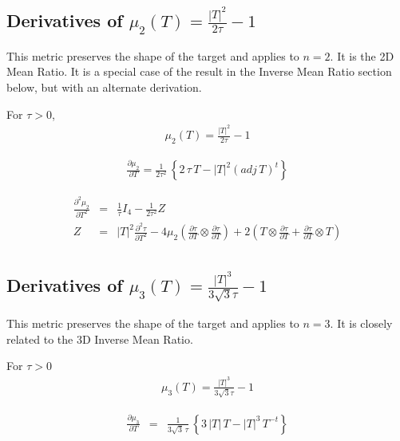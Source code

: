 \documentclass{report}
\begin{document}
\subsection{Derivatives of $\mu_2(T) = \frac{|T|^2}{2 \tau}-1$ \label{shape+2d} }

\noindent This metric preserves the shape of the target and applies
to $n=2$. It is the 2D Mean Ratio. It is a special case of the result
in the Inverse Mean Ratio section below, but with an alternate derivation. \newline

\noindent For $\tau>0$,
\begin{eqnarray}
\mu_2(T) = \frac{|T|^2}{2 \tau} - 1
\end{eqnarray}

\begin{eqnarray}
\frac{\partial \mu_2}{\partial T} = \frac{1}{2 \tau^2} \, \left\{ 2 \, \tau \, T - |T|^2 (adj \, T)^t \right\}
\end{eqnarray}

\begin{eqnarray}
\frac{\partial^2 \mu_2}{\partial T^2} & = & \frac{1}{\tau} I_4 - \frac{1}{2 \tau^2} Z \\
Z & = & |T|^2 \frac{\partial^2 \tau}{\partial T^2} - 4 \mu_2 \left(\frac{\partial \tau}{\partial T} \otimes \frac{\partial \tau}{\partial T} \right) + 2 \left( T \otimes \frac{\partial \tau}{\partial T} + \frac{\partial \tau}{\partial T} \otimes T \right) \nonumber \\
\end{eqnarray}

\subsection{Derivatives of $\mu_3(T)=\frac{|T|^3}{3 \sqrt{3} \tau}-1$ \label{shape+3d}}

\noindent This metric preserves the shape of the target and applies
to $n=3$. It is closely related to the 3D Inverse Mean Ratio. \newline

\noindent For $\tau>0$
\begin{eqnarray}
\mu_3(T)=\frac{|T|^3}{3 \sqrt{3} \tau} - 1
\end{eqnarray}

\begin{eqnarray}
\frac{\partial \mu_3}{\partial T} & = & \frac{1}{3 \sqrt{3} \, \tau} \, \left\{ 3 \, |T| \, T - |T|^3 \, T^{-t} \right\}
\end{eqnarray}
\end{document}
